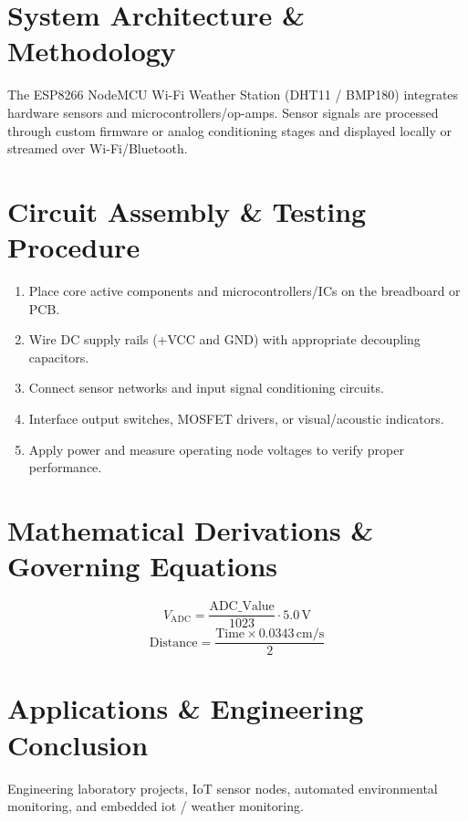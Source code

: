 \documentclass[11pt,a4paper]{article}
\begin{document}
\section{System Architecture \& Methodology}
The ESP8266 NodeMCU Wi-Fi Weather Station (DHT11 / BMP180) integrates hardware sensors and microcontrollers/op-amps. Sensor signals are processed through custom firmware or analog conditioning stages and displayed locally or streamed over Wi-Fi/Bluetooth.

\section{Circuit Assembly \& Testing Procedure}
\begin{enumerate}
    \item Place core active components and microcontrollers/ICs on the breadboard or PCB.
    \item Wire DC supply rails (+VCC and GND) with appropriate decoupling capacitors.
    \item Connect sensor networks and input signal conditioning circuits.
    \item Interface output switches, MOSFET drivers, or visual/acoustic indicators.
    \item Apply power and measure operating node voltages to verify proper performance.
\end{enumerate}

\section{Mathematical Derivations \& Governing Equations}
\begin{equation}
V_{\text{ADC}} = \frac{\text{ADC\_Value}}{1023} \cdot 5.0\,\text{V}
\end{equation}
\begin{equation}
\text{Distance} = \frac{\text{Time} \times 0.0343\,\text{cm/s}}{2}
\end{equation}

\section{Applications \& Engineering Conclusion}
Engineering laboratory projects, IoT sensor nodes, automated environmental monitoring, and embedded iot / weather monitoring.
\end{document}
